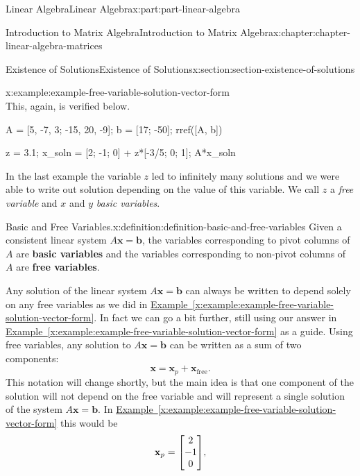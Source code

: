 \documentclass[twoside,10pt,]{book}
\newcommand{\xreffont}{\relax}
\newcommand{\terminology}[1]{\textbf{#1}}
\numberwithin{equation}{part}
\providecommand{\vb}[1]{\mathbf{#1}}
\begin{document}
\begin{partptx}{Linear Algebra}{}{Linear Algebra}{}{}{x:part:part-linear-algebra}
\begin{chapterptx}{Introduction to Matrix Algebra}{}{Introduction to Matrix Algebra}{}{}{x:chapter:chapter-linear-algebra-matrices}
\begin{sectionptx}{Existence of Solutions}{}{Existence of Solutions}{}{}{x:section:section-existence-of-solutions}
\begin{example}{}{x:example:example-free-variable-solution-vector-form}
\begin{equation*}
\end{equation*}
This, again, is verified below.%
\end{example}
\begin{sageinput}
A = [5, -7, 3; -15, 20, -9];
b = [17; -50];
rref([A, b]) %

z = 3.1; %
x_soln = [2; -1; 0] + z*[-3/5; 0; 1]; %
A*x_soln %
\end{sageinput}
In the last example the variable \(z\) led to infinitely many solutions and we were able to write out solution depending on the value of this variable. We call \(z\) a \emph{free variable} and \(x\) and \(y\) \emph{basic variables}.%
\begin{definition}{Basic and Free Variables.}{x:definition:definition-basic-and-free-variables}%
%
%
Given a consistent linear system \(A\vb{x}=\vb{b}\), the variables corresponding to pivot columns of \(A\) are \terminology{basic variables} and the variables corresponding to non-pivot columns of \(A\) are \terminology{free variables}.%
\end{definition}
Any solution of the linear system \(A\vb{x} = \vb{b}\) can always be written to depend solely on any free variables as we did in \hyperref[x:example:example-free-variable-solution-vector-form]{Example~{\xreffont\ref{x:example:example-free-variable-solution-vector-form}}}. In fact we can go a bit further, still using our answer in \hyperref[x:example:example-free-variable-solution-vector-form]{Example~{\xreffont\ref{x:example:example-free-variable-solution-vector-form}}} as a guide. Using free variables, any solution to \(A\vb{x}=\vb{b}\) can be written as a sum of two components:%
\begin{equation*}
\vb{x} = \vb{x}_p + \vb{x}_{\text{free}}.
\end{equation*}
This notation will change shortly, but the main idea is that one component of the solution will not depend on the free variable and will represent a single solution of the system \(A\vb{x} = \vb{b}\). In \hyperref[x:example:example-free-variable-solution-vector-form]{Example~{\xreffont\ref{x:example:example-free-variable-solution-vector-form}}} this would be%
\begin{equation*}
\vb{x}_{p} = \mqty[2\\-1\\0],
\end{equation*}

\end{sectionptx}
\end{chapterptx}
\end{partptx}
\end{document}
